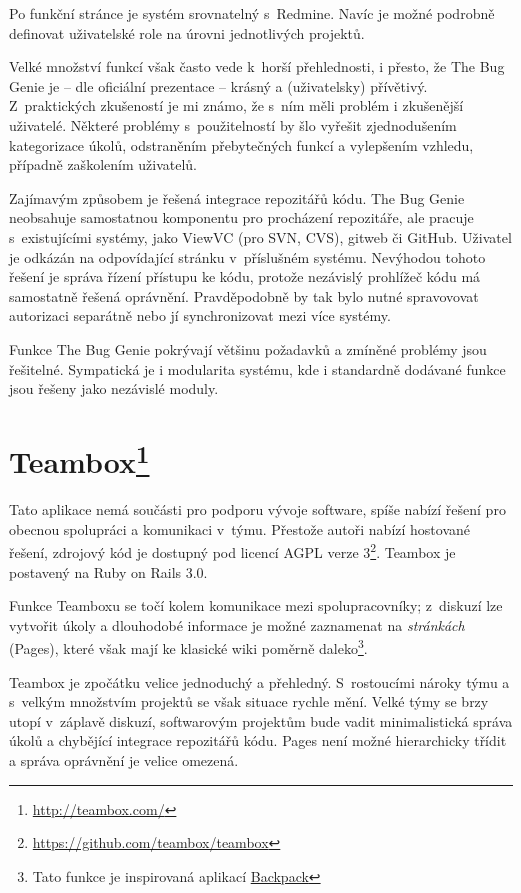 \documentclass[thesis=B,czech]{FITthesis}[2012/05/02]
\begin{document}
Po funkční stránce je systém srovnatelný s~Redmine. Navíc je možné
podrobně definovat uživatelské role na úrovni jednotlivých projektů.

Velké množství funkcí však často vede k~horší přehlednosti, i přesto, že
The Bug Genie je -- dle oficiální prezentace -- krásný a
(uživatelsky) přívětivý. Z~praktických zkušeností je mi známo, že s~ním měli problém i
zkušenější uživatelé. Některé problémy s~použitelností by šlo vyřešit
zjednodušením kategorizace úkolů, odstraněním přebytečných funkcí a
vylepšením vzhledu, případně zaškolením uživatelů.

Zajímavým způsobem je řešená integrace repozitářů kódu. The Bug Genie
neobsahuje samostatnou komponentu pro procházení repozitáře, ale pracuje
s~existujícími systémy, jako ViewVC (pro SVN, CVS), gitweb či GitHub.
Uživatel je odkázán na odpovídající stránku v~příslušném systému.
Nevýhodou tohoto řešení je správa řízení přístupu ke kódu, protože
nezávislý prohlížeč kódu má samostatně řešená oprávnění. Pravděpodobně
by tak bylo nutné spravovovat autorizaci separátně nebo jí
synchronizovat mezi více systémy.

Funkce The Bug Genie pokrývají většinu požadavků a zmíněné problémy jsou
řešitelné. Sympatická je i modularita systému, kde i standardně dodávané
funkce jsou řešeny jako nezávislé moduly.

\section[Teambox]{Teambox\footnote{\url{http://teambox.com/}}}

Tato aplikace nemá součásti pro podporu vývoje software, spíše nabízí
řešení pro obecnou spolupráci a komunikaci v~týmu. Přestože autoři
nabízí hostované řešení, zdrojový kód je dostupný pod licencí \gls{AGPL}
verze 3\footnote{\url{https://github.com/teambox/teambox}}. Teambox je
postavený na Ruby on Rails 3.0.

Funkce Teamboxu se točí kolem komunikace mezi spolupracovníky; z~diskuzí
lze vytvořit úkoly a dlouhodobé informace je možné zaznamenat na
\emph{stránkách} (Pages), které však mají ke klasické wiki poměrně
daleko\footnote{Tato funkce je inspirovaná aplikací
  \href{http://backpackit.com/}{Backpack}}.

Teambox je zpočátku velice jednoduchý a přehledný.
S~rostoucími nároky týmu a s~velkým množstvím projektů se však situace rychle mění.
Velké týmy se brzy utopí v~záplavě diskuzí, softwarovým projektům
bude vadit minimalistická správa úkolů a chybějící integrace repozitářů
kódu. Pages není možné hierarchicky třídit a správa oprávnění je velice
omezená.
\end{document}
